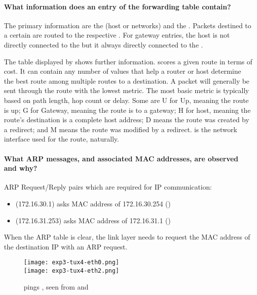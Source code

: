 \documentclass[compilation.tex]{subfiles}
\begin{document}
\paragraph{What information does an entry of the forwarding table contain?}
The primary information are the  (host or networks) and the . Packets destined to a certain  are routed to the respective . For gateway entries, the host is not directly connected to the  but it always directly connected to the .

The table displayed by  shows further information.  scores a given route in terms of cost. It can contain any number of values that help a router or host determine the best route among multiple routes to a destination. A packet will generally be sent through the route with the lowest metric. The most basic metric is typically based on path length, hop count or delay. Some  are U for Up, meaning the route is up; G for Gateway, meaning the route is to a gateway; H for host, meaning the route's destination is a complete host address; D means the route was created by a redirect; and M means the route was modified by a redirect.  is the network interface used for the route, naturally.

\paragraph{What ARP messages, and associated MAC addresses, are observed and why?}
ARP Request/Reply pairs which are required for IP communication:
\begin{itemize}[noitemsep,leftmargin=*,topsep=0pt]
\item {} (172.16.30.1) asks MAC address of 172.16.30.254 ()
\item {} (172.16.31.253) asks MAC address of 172.16.31.1 ()
\end{itemize}
When the ARP table is clear, the link layer needs to request the MAC address of the destination IP with an ARP request.

\begin{figure}[hbt]
\centering
\texttt{[image: exp3-tux4-eth0.png]}\\
\vspace*{.8\baselineskip}
\texttt{[image: exp3-tux4-eth2.png]}
\caption{ pings , seen from  and }
\label{fig:exp3-tux4.png}
\end{figure}
\end{document}
